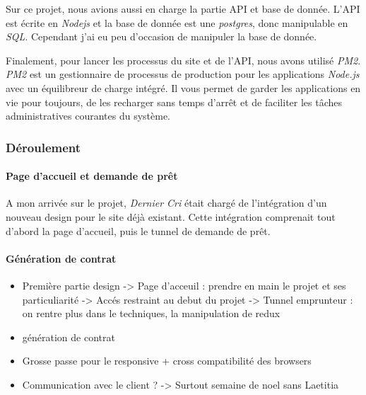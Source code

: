 \documentclass[12pt,a4paper]{article}
\begin{document}
  \bigskip

  Sur ce projet, nous avions aussi en charge la partie API et base de
  donnée. L'API est écrite en \emph{Nodejs} et la base de donnée est une
  \emph{postgres}, donc manipulable en \emph{SQL}. Cependant j'ai eu peu
  d'occasion de manipuler la base de donnée.

  \bigskip

  Finalement, pour lancer les processus du site et de l'API, nous avons
  utilisé \emph{PM2}. \emph{PM2} est un gestionnaire de processus de
  production pour les applications \emph{Node.js} avec un équilibreur de
  charge intégré. Il vous permet de garder les applications en vie pour
  toujours, de les recharger sans temps d'arrêt et de faciliter les tâches
  administratives courantes du système.

  \bigskip

  \subsubsection{Déroulement}\label{duxe9roulement-1}

  \paragraph{Page d'accueil et demande de
  prêt}\label{page-daccueil-et-demande-de-pruxeat}

  \bigskip

  A mon arrivée sur le projet, \emph{Dernier Cri} était chargé de
  l'intégration d'un nouveau design pour le site déjà existant. Cette
  intégration comprenait tout d'abord la page d'accueil, puis le tunnel de
  demande de prêt.

  \bigskip

  \bigskip

  \paragraph{Génération de contrat}\label{guxe9nuxe9ration-de-contrat}

  \bigskip

  \bigskip

  \begin{itemize}
  \item
    Première partie design -\textgreater{} Page d'acceuil : prendre en
    main le projet et ses particuliarité -\textgreater{} Accés restraint
    au debut du projet -\textgreater{} Tunnel emprunteur : on rentre plus
    dans le techniques, la manipulation de redux
  \item
    génération de contrat
  \item
    Grosse passe pour le responsive + cross compatibilité des browsers
  \item
    Communication avec le client ? -\textgreater{} Surtout semaine de noel
    sans Laetitia
  \end{itemize}
\end{document}
